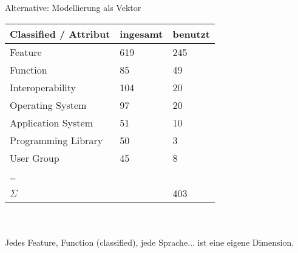 \documentclass[aspectratio=1610]{beamer}
\begin{document}

\begin{frame}{Alternative: Modellierung als Vektor}
\begin{tabular}{lll}
\toprule
Classified / Attribut		&ingesamt	&benutzt\\
\midrule
Feature						&619		&245\\
Function					&85			&49\\	
Interoperability			&104		&20\\
Operating System			&97			&20\\
Application System			&51			&10\\
Programming Library			&50			&3\\
User Group					&45			&8\\
\ldots\\
\midrule
$\Sigma$					&			&403\\
\bottomrule
\end{tabular}
~\\~\\
Jedes Feature, Function (classified), jede Sprache$\ldots$ ist eine eigene Dimension.\\
\end{frame}
\end{document}
